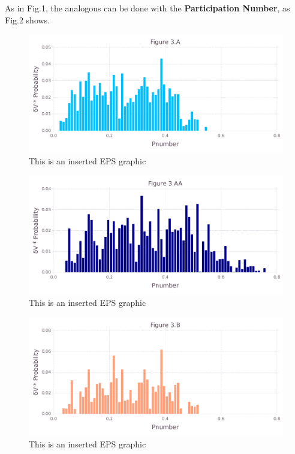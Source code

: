 \documentclass[10pt,letterpaper]{article}
\begin{document}
\clearpage
As in Fig.1, the analogous can be done with the \textbf{Participation Number}, as Fig.2 shows.

\begin{figure}[ht]
\begin{center}
\includegraphics[scale=0.5]{1hvr_apo/3afigure.pdf}
\caption{This is an inserted EPS graphic}
\label{fig7}
\end{center}
\end{figure}

\begin{figure}[ht]
\begin{center}
\includegraphics[scale=0.5]{1hvr_apo/3aafigure.pdf}
\caption{This is an inserted EPS graphic}
\label{fig8}
\end{center}
\end{figure}

\begin{figure}[ht]
\begin{center}
\includegraphics[scale=0.5]{1hvr_apo/3bfigure.pdf}
\caption{This is an inserted EPS graphic}
\label{fig10}
\end{center}
\end{figure}
\end{document}
